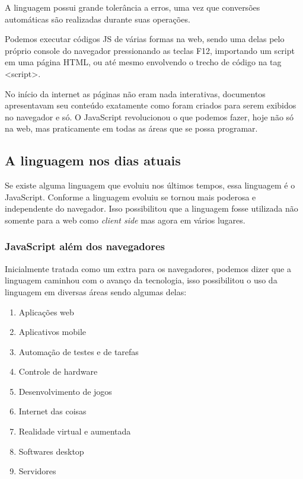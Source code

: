 \documentclass[
	12pt,				%
	openright,			%
	twoside,			%
	a4paper,			%
	english,			%
	brazil				%
	]{abntex2}
\begin{document}
A linguagem possui grande tolerância a erros, uma vez que conversões automáticas são realizadas durante suas operações.

Podemos executar códigos JS de várias formas na web, sendo uma delas pelo próprio console do navegador pressionando as teclas F12, importando um script em uma página HTML, ou até mesmo envolvendo o trecho de código na tag <script>.

No início da internet as páginas não eram nada interativas, documentos apresentavam seu conteúdo exatamente como foram criados para serem exibidos no navegador e só. O JavaScript revolucionou o que podemos fazer, hoje não só na web, mas praticamente em todas as áreas que se possa programar. 

\subsection{A linguagem nos dias atuais}

Se existe alguma linguagem que evoluiu nos últimos tempos, essa linguagem é o JavaScript. Conforme a linguagem evoluiu se tornou mais poderosa e independente do navegador. Isso possibilitou que a linguagem fosse utilizada não somente para a web como \textit{client side} mas agora em vários lugares. 

\subsubsection{JavaScript além dos navegadores}
\label{subsec:JavaScriptAlemNavegadores}

Inicialmente tratada como um extra para os navegadores, podemos dizer que a linguagem caminhou com o avanço da tecnologia, isso possibilitou o uso da linguagem em diversas áreas sendo algumas delas:

\begin{enumerate}[label=\alph*)]
\item Aplicações web
\item Aplicativos mobile 
\item Automação de testes e de tarefas
\item Controle de hardware
\item Desenvolvimento de jogos
\item Internet das coisas
\item Realidade virtual e aumentada
\item Softwares desktop
\item Servidores 
\end{enumerate}
\end{document}
